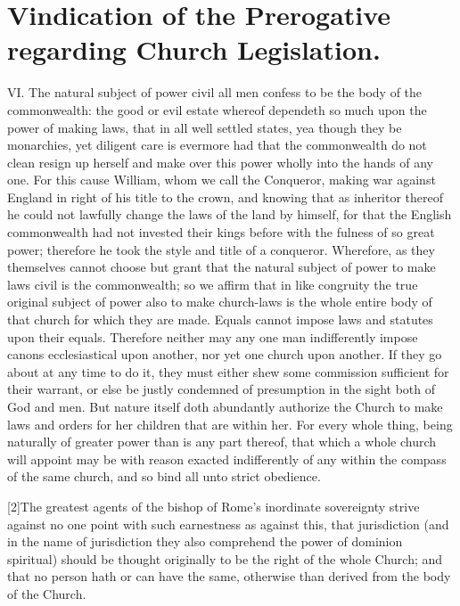
\section*{Vindication of the Prerogative regarding Church Legislation.}

VI. The natural subject of power civil all men confess to be the body of the commonwealth: the good or evil estate whereof dependeth so much upon the power of making laws, that in all well settled states, yea though they be monarchies, yet diligent care is evermore had that the commonwealth do not clean resign up herself and make over this power wholly into the hands of any one.
For this cause William, whom we call the Conqueror, making war against England in right of his title to the crown, and knowing that as inheritor thereof he could not lawfully change the laws of the land by himself, for that the English commonwealth had not invested their kings before with the fulness of so great power; therefore he took the style and title of a conqueror. Wherefore, as they themselves cannot choose but grant that the natural subject of power to make laws civil is the commonwealth; so we affirm that in like congruity the true original subject of power also to make church-laws is the whole entire body of that church for which they are made. Equals cannot impose laws and statutes upon their equals. Therefore neither may any one man indifferently impose canons ecclesiastical upon another, nor yet one church upon another. If they go about at any time to do it, they must either shew some commission sufficient for their warrant, or else be justly condemned of presumption in the sight both of God and men. But nature itself doth abundantly authorize the Church to make laws and orders for her children that are within her. For every whole thing, being naturally of greater power than is any part thereof, that which a whole church will appoint may be with reason exacted indifferently of any within the compass of the same church, and so bind all unto strict obedience.

[2]The greatest agents of the bishop of Rome’s inordinate sovereignty strive against no one point with such earnestness as against this, that jurisdiction (and in the name of jurisdiction they also comprehend the power of dominion spiritual)  should be thought originally to be the right of the whole Church; and that no person hath or can have the same, otherwise than derived from the body of the Church.

